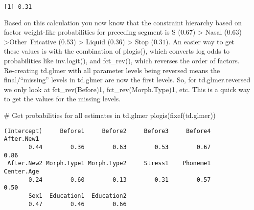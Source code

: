 \documentclass[
  10pt,
  letterpaper]{article}
\newenvironment{Shaded}{\begin{snugshade}}{\end{snugshade}}
\newcommand{\CommentTok}[1]{\textcolor[rgb]{0.37,0.37,0.37}{#1}}
\newcommand{\FunctionTok}[1]{\textcolor[rgb]{0.28,0.35,0.67}{#1}}
\newcommand{\NormalTok}[1]{\textcolor[rgb]{0.00,0.23,0.31}{#1}}
\renewcommand\texttt[1]{{\ttfamily\color{BrickRed}#1}}
\begin{document}
\begin{verbatim}
[1] 0.31
\end{verbatim}

Based on this calculation you now know that the constraint hierarchy
based on factor weight-like probabilities for preceding segment is
\texttt{S} (\(0.67\)) \textgreater{} \texttt{Nasal} (\(0.63\))
\textgreater{}\texttt{Other\ Fricative} (\(0.53\)) \textgreater{}
\texttt{Liquid} (\(0.36\)) \textgreater{} \texttt{Stop} (\(0.31\)). An
easier way to get these values is with the combination of
\texttt{plogis()}, which converts log odds to probabilities like
\texttt{inv.logit()}, and \texttt{fct\_rev()}, which reverses the order
of factors. Re-creating \texttt{td.glmer} with all parameter levels
being reversed means the final/``missing'' levels in \texttt{td.glmer}
are now the first levels. So, for \texttt{td.glmer.reversed} we only
look at \texttt{fct\_rev(Before)1}, \texttt{fct\_rev(Morph.Type)1}, etc.
This is a quick way to get the values for the missing levels.

\begin{Shaded}
\begin{Highlighting}[]
\CommentTok{\# Get probabilities for all estimates in td.glmer}
\FunctionTok{plogis}\NormalTok{(}\FunctionTok{fixef}\NormalTok{(td.glmer))}
\end{Highlighting}
\end{Shaded}

\begin{verbatim}
(Intercept)     Before1     Before2     Before3     Before4  After.New1 
       0.44        0.36        0.63        0.53        0.67        0.86 
 After.New2 Morph.Type1 Morph.Type2     Stress1    Phoneme1  Center.Age 
       0.24        0.60        0.13        0.31        0.57        0.50 
       Sex1  Education1  Education2 
       0.47        0.46        0.66 
\end{verbatim}
\end{document}
